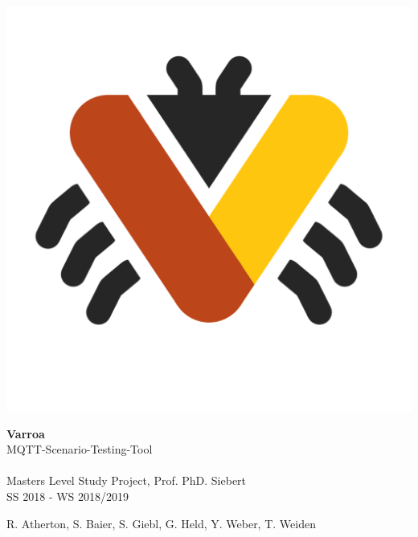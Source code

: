 \begin{titlepage}


\begin{center}
 		\includegraphics[scale=0.3]{Resources/Logo3}
\end{center}

\begin{center}
	\HUGE \textbf{Varroa}
	\large\\MQTT-Scenario-Testing-Tool\\ \ \\
	\small Masters Level Study Project, Prof. PhD. Siebert \\
	SS 2018 - WS 2018/2019
\end{center}

\begin{center}
R. Atherton, S. Baier, S. Giebl, G. Held, Y. Weber, T. Weiden
\end{center}

\end{titlepage}

